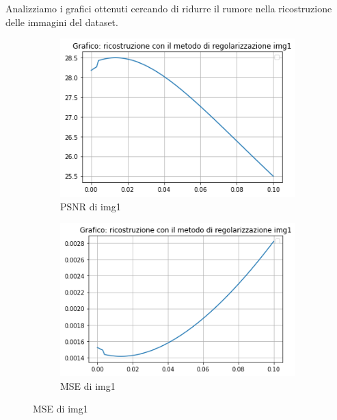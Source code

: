Analizziamo i grafici ottenuti cercando di ridurre il rumore nella ricostruzione delle immagini del dataset. 
\begin{figure}[H]
    \centering
    \begin{subfigure}{0.5\textwidth}
        \centering
        \includegraphics[width=\textwidth]{output/PSNR/outputPSNR-img1.png}
        \caption{PSNR di img1}
        \label{fig:img1PSNR}
    \end{subfigure}\hfill
    \begin{subfigure}{0.5\textwidth}
        \centering
        \includegraphics[width=\textwidth]{output/MSE/outputMSE-img1.png}
        \caption{MSE di img1}
        \label{fig:img1MSE}
    \end{subfigure}


\end{figure}

